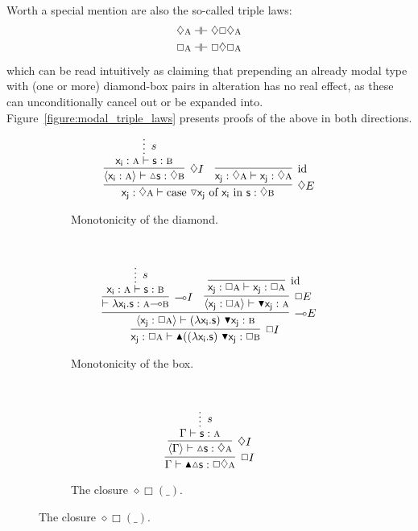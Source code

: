 Worth a special mention are also the so-called triple laws:
\begin{align*}
	\diamond\prop{A} \dashv\vdash \diamond\Box\diamond\prop{A}\\
	\Box\prop{A} \dashv\vdash \Box\diamond\Box\prop{A}
\end{align*}
which can be read intuitively as claiming that prepending an already modal type with (one or more) diamond-box pairs in alteration has no real effect, as these can unconditionally cancel out or be expanded into.
Figure~\ref{figure:modal_triple_laws} presents proofs of the above in both directions.

\begin{figure}
	\centering
	\begin{subfigure}{1\textwidth}
		\[
			\infer[\diamond E]{\term{x_j}: \diamond \prop{A} \vdash  \cterm{case \term{\diaelim x_j} of \term{x_i} in \term{s}}: \diamond \prop{B}}{
					\infer[\diamond I]{\bracket{\term{x_i}: \prop{A}} \vdash \diaintro \term{s}: \diamond \prop{B}}{
						\infer*[s]{\term{x_i}: \prop{A} \vdash \term{s}: \prop{B}}{}
					}
					&
					\infer[\Ax]{\term{x_j}: \diamond \prop{A} \vdash \term{x_j}: \diamond \prop{A}}{}
			}
		\]
		\caption{Monotonicity of the diamond.}
		\label{subfigure:modal_properties:diamond_mono}
	\end{subfigure}\\[\midsep]
	\begin{subfigure}{1\textwidth}
		\[
			\infer[\Box I]{\term{x_j}: \Box \prop{A} \vdash \boxintro{((\term{\lambda x_i.s})~\term{\boxelim x_j}}:\Box \prop{B}}{
				\infer[\li E]{\bracket{\term{x_j}: \Box \prop{A}} \vdash (\term{\lambda x_i.s})~\term{\boxelim x_j}: \prop{B}}{
					\infer[\li I]{\vdash \term{\lambda x_i.s}: \prop{A} \li\prop{B}}{
						\infer*[s]{\term{x_i}: \prop{A} \vdash \term{s}: \prop{B}}{}
					}
					&
					\infer[\Box E]{\bracket{\term{x_j}: \Box \prop{A}} \vdash \boxelim\term{x_j}:\prop{A}}{	
						\infer[\Ax]{\term{x_j}: \Box\prop{A} \vdash \term{x_j}: \Box\prop{A}}{}
					}
				}
			}
		\]
		\caption{Monotonicity of the box.}
		\label{subfigure:modal_properties:box_mono}
	\end{subfigure}\\[\midsep]
	\begin{subfigure}{0.4\textwidth}
		\[
		\infer[\Box I]{\Gamma \vdash \boxintro\diaintro\term{s}:\Box \diamond \prop{A}}{
			\infer[\diamond I]{\bracket{\Gamma} \vdash \diaintro\term{s}: \diamond \prop{A}}{
				\infer*[s]{\Gamma \vdash \term{s}: \prop{A}}{}
			}
		}
		\]
		\caption{The closure $\diamond\Box(\_)$.}

\end{subfigure}
\end{figure}
